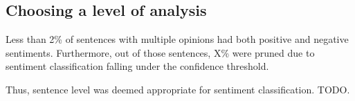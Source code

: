 \documentclass[a4paper,11pt]{kth-mag}
\newcommand{\todo}{ ... }
\begin{document}
\subsection{Choosing a level of analysis}
\label{subsec:sentence_contradictions}
Less than 2\% of sentences with multiple opinions had both positive and negative sentiments.
Furthermore, out of those sentences, X\% were pruned due to sentiment classification falling under the
confidence threshold.

Thus, sentence level was deemed appropriate for sentiment classification. TODO.


%
%
%
\end{document}
